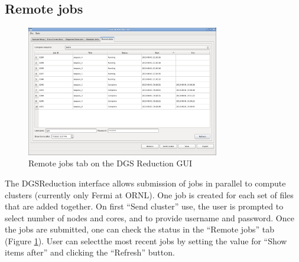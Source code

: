 \subsection{Remote jobs}

\begin{figure}[ht]
\centerline{\includegraphics[width=0.75\textwidth]{figures/cluster.png}}
\caption{Remote jobs tab on the DGS Reduction GUI}
\label{fig:cluster}
\end{figure}

The DGSReduction interface allows submission of jobs in parallel to compute clusters (currently only Fermi at ORNL). One job is created for each set of files that are added together. On first ``Send cluster'' use, the user is prompted to select number of nodes and cores, and to provide username and password. Once the jobs are submitted, one can check the status in the ``Remote jobs'' tab (Figure \ref{fig:cluster}). User can selectthe most recent jobs by setting the value for ``Show items after'' and clicking the ``Refresh'' button. 

